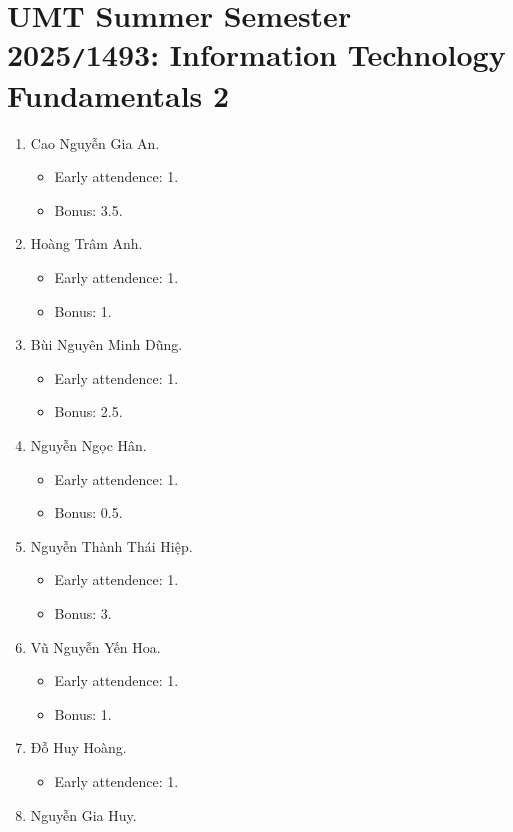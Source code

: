 \documentclass{article}
\begin{document}

\section{UMT Summer Semester 2025{\tt/}1493: Information Technology Fundamentals 2}

\begin{enumerate}
	\item {\sc Cao Nguyễn Gia An.}
	\begin{itemize}
		\item Early attendence: 1.
		\item Bonus: 3.5.
	\end{itemize}
	\item {\sc Hoàng Trâm Anh.}
	\begin{itemize}
		\item Early attendence: 1.
		\item Bonus: 1.
	\end{itemize}
	\item {\sc Bùi Nguyên Minh Dũng.}
	\begin{itemize}
		\item Early attendence: 1.
		\item Bonus: 2.5.
	\end{itemize}
	\item {\sc Nguyễn Ngọc Hân.}
	\begin{itemize}
		\item Early attendence: 1.
		\item Bonus: 0.5.
	\end{itemize}
	\item {\sc Nguyễn Thành Thái Hiệp.}
	\begin{itemize}
		\item Early attendence: 1.
		\item Bonus: 3.
	\end{itemize}
	\item {\sc Vũ Nguyễn Yến Hoa.}
	\begin{itemize}
		\item Early attendence: 1.
		\item Bonus: 1.
	\end{itemize}
	\item {\sc Đỗ Huy Hoàng.}
	\begin{itemize}
		\item Early attendence: 1.
	\end{itemize}
	\item {\sc Nguyễn Gia Huy.}

\end{enumerate}
\end{document}
